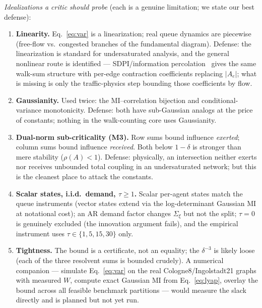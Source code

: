 \documentclass[11pt]{article}
\theoremstyle{definition}
\theoremstyle{remark}
\begin{document}
\emph{Idealizations a critic should probe} (each is a genuine limitation; we
state our best defense):
\begin{enumerate}
    \item \textbf{Linearity.} Eq.~\eqref{eq:var} is a linearization; real
          queue dynamics are piecewise (free-flow vs.\ congested branches of
          the fundamental diagram).
          Defense: the linearization is standard for undersaturated analysis,
          and the general nonlinear route is identified --- SDPI/information
          percolation~\citep{evans1999percolation,polyanskiy2017sdpi} gives
          the same walk-sum structure with per-edge contraction coefficients
          replacing $|A_e|$; what is missing is only the traffic-physics step
          bounding those coefficients by flow.
    \item \textbf{Gaussianity.} Used twice: the MI--correlation bijection and
          conditional-variance monotonicity.
          Defense: both have sub-Gaussian analogs at the price of constants;
          nothing in the walk-counting core uses Gaussianity.
    \item \textbf{Dual-norm sub-criticality (M3).} Row sums bound influence
          \emph{exerted}; column sums bound influence \emph{received}.
          Both below $1 - \delta$ is stronger than mere stability
          ($\rho(A) < 1$).
          Defense: physically, an intersection neither exerts nor receives
          unbounded total coupling in an undersaturated network; but this is
          the cleanest place to attack the constants.
    \item \textbf{Scalar states, i.i.d.\ demand, $\tau \geq 1$.} Scalar
          per-agent states match the queue instruments (vector states extend
          via the log-determinant Gaussian MI at notational cost); an AR
          demand factor changes $\Sigma_\xi$ but not the split; $\tau = 0$ is
          genuinely excluded (the innovation argument fails), and the
          empirical instrument uses $\tau \in \{1, 5, 15, 30\}$ only.
    \item \textbf{Tightness.} The bound is a certificate, not an equality;
          the $\delta^{-3}$ is likely loose (each of the three resolvent sums
          is bounded crudely).
          A numerical companion --- simulate Eq.~\eqref{eq:var} on the real
          Cologne8/Ingolstadt21 graphs with measured $W$, compute exact
          Gaussian MI from Eq.~\eqref{eq:lyap}, overlay the bound across all
          feasible benchmark partitions --- would measure the slack directly
          and is planned but not yet run.
\end{enumerate}
\end{document}
